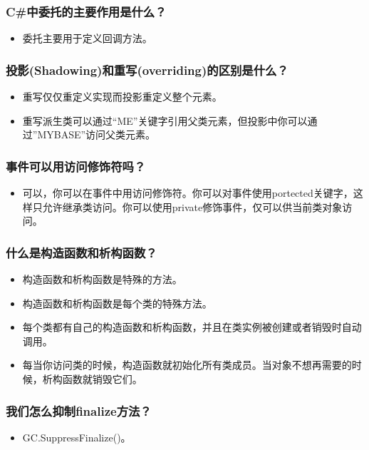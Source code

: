 \documentclass[9pt, b5paper]{article}
\begin{document}
\subsubsection{C\#中委托的主要作用是什么？}
\label{sec-1-2-40}
\begin{itemize}
\item 委托主要用于定义回调方法。
\end{itemize}
\subsubsection{投影(Shadowing)和重写(overriding)的区别是什么？}
\label{sec-1-2-41}
\begin{itemize}
\item 重写仅仅重定义实现而投影重定义整个元素。
\item 重写派生类可以通过“ME”关键字引用父类元素，但投影中你可以通过”MYBASE”访问父类元素。
\end{itemize}
\subsubsection{事件可以用访问修饰符吗？}
\label{sec-1-2-42}
\begin{itemize}
\item 可以，你可以在事件中用访问修饰符。你可以对事件使用portected关键字，这样只允许继承类访问。你可以使用private修饰事件，仅可以供当前类对象访问。
\end{itemize}
\subsubsection{什么是构造函数和析构函数？}
\label{sec-1-2-43}
\begin{itemize}
\item 构造函数和析构函数是特殊的方法。
\item 构造函数和析构函数是每个类的特殊方法。
\item 每个类都有自己的构造函数和析构函数，并且在类实例被创建或者销毁时自动调用。
\item 每当你访问类的时候，构造函数就初始化所有类成员。当对象不想再需要的时候，析构函数就销毁它们。
\end{itemize}
\subsubsection{我们怎么抑制finalize方法？}
\label{sec-1-2-44}
\begin{itemize}
\item GC.SuppressFinalize()。
\end{itemize}
\end{document}
